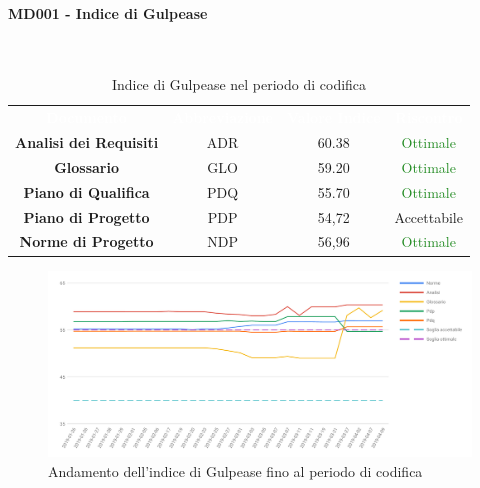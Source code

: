 \paragraph{MD001 - Indice di Gulpease}\mbox{}\\[0,3cm]
\begin{table}[H]
	\centering
	\begin{tabular}{cccc}
	\rowcolor{greySWEight}
	\textcolor{white}{\textbf{Documento}} & 
	\textcolor{white}{\textbf{Abbreviazione}} &
	\textcolor{white}{\textbf{Valore Indice}}&
	\textcolor{white}{\textbf{Riscontro}}\\
	
	\textbf{Analisi dei Requisiti} & ADR & 60.38 & \textcolor{ForestGreen}{Ottimale} \\
	\textbf{Glossario} & GLO & 59.20 & \textcolor{ForestGreen}{Ottimale} \\
	\textbf{Piano di Qualifica} & PDQ & 55.70 & \textcolor{ForestGreen}{Ottimale} \\
	\textbf{Piano di Progetto} & PDP & 54,72 & \textcolor{YellowOrange}{Accettabile} \\
	\textbf{Norme di Progetto} & NDP & 56,96 & \textcolor{ForestGreen}{Ottimale} \\

	\end{tabular}
	\caption{Indice di Gulpease nel periodo di codifica}
\end{table}

\begin{figure}[H]
	\includegraphics[width=1\linewidth]{sez/App_Esito/Qualifica/graph/gulpeaseRQ.pdf}
	\caption{Andamento dell'indice di Gulpease fino al periodo di codifica}
\end{figure}
\newpage